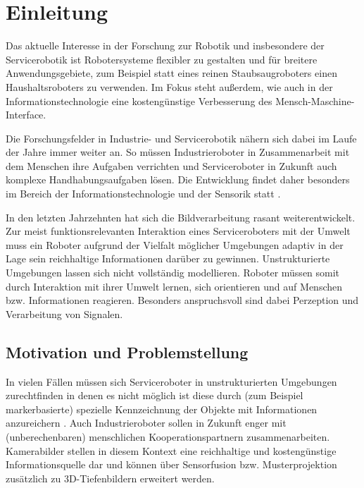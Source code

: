 \chapter{Einleitung}
\label{einleitung_cha}
\authorsection{\editordummy}
Das aktuelle Interesse in der Forschung zur Robotik und insbesondere der Servicerobotik
 ist Robotersysteme flexibler zu gestalten und für breitere Anwendungsgebiete, zum Beispiel
 statt eines reinen Staubsaugroboters einen Haushaltsroboters zu verwenden.
 Im Fokus steht außerdem, wie auch in der Informationstechnologie eine kostengünstige Verbesserung des Mensch-Maschine-Interface.

Die Forschungsfelder in Industrie- und Servicerobotik nähern sich dabei im Laufe der Jahre immer weiter an.
 So müssen Industrieroboter in Zusammenarbeit mit dem Menschen ihre Aufgaben verrichten und Serviceroboter
 in Zukunft auch komplexe Handhabungsaufgaben lösen. Die Entwicklung findet daher besonders im Bereich der
 Informationstechnologie und der Sensorik statt \citep{Michael2010}.
 
In den letzten Jahrzehnten hat sich die Bildverarbeitung rasant weiterentwickelt.
 Zur meist funktionsrelevanten Interaktion eines Serviceroboters mit der Umwelt muss
 ein Roboter aufgrund der Vielfalt möglicher Umgebungen adaptiv in der Lage sein reichhaltige
 Informationen darüber zu gewinnen. Unstrukturierte Umgebungen lassen sich nicht vollständig modellieren.
 Roboter müssen somit durch Interaktion mit ihrer Umwelt lernen, sich orientieren und auf Menschen bzw. Informationen reagieren.
 Besonders anspruchsvoll sind dabei Perzeption und Verarbeitung von Signalen.

\section{Motivation und Problemstellung}
\label{motivation_sec}
\authorsection{\editordummy}

In vielen Fällen müssen sich Serviceroboter in unstrukturierten Umgebungen zurechtfinden in denen es nicht möglich ist diese durch
 (zum Beispiel markerbasierte) spezielle Kennzeichnung der Objekte mit Informationen anzureichern \citep{sturm10rss-workshop}.
 Auch Industrieroboter sollen in Zukunft enger mit (unberechenbaren) menschlichen Kooperationspartnern zusammenarbeiten.
 Kamerabilder stellen in diesem Kontext eine reichhaltige und kostengünstige Informationsquelle dar und können über Sensorfusion bzw. Musterprojektion zusätzlich
 zu 3D-Tiefenbildern erweitert werden. 

